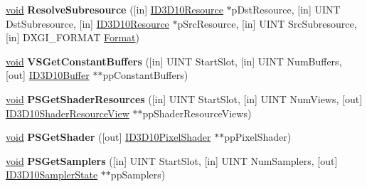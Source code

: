 \begin{DoxyCompactItemize}
\item 
\mbox{\label{interface_i_d3_d10_device_ae6de3bf40e277e9e668aef2fba4d8fac}} 
\hyperlink{interfacevoid}{void} {\bfseries Resolve\+Subresource} (\mbox{[}in\mbox{]} \hyperlink{interface_i_d3_d10_resource}{I\+D3\+D10\+Resource} $\ast$p\+Dst\+Resource, \mbox{[}in\mbox{]} U\+I\+NT Dst\+Subresource, \mbox{[}in\mbox{]} \hyperlink{interface_i_d3_d10_resource}{I\+D3\+D10\+Resource} $\ast$p\+Src\+Resource, \mbox{[}in\mbox{]} U\+I\+NT Src\+Subresource, \mbox{[}in\mbox{]} D\+X\+G\+I\+\_\+\+F\+O\+R\+M\+AT \hyperlink{struct_format}{Format})
\item 
\mbox{\label{interface_i_d3_d10_device_a93ee08cdda4d11807fce58d443b13fc6}} 
\hyperlink{interfacevoid}{void} {\bfseries V\+S\+Get\+Constant\+Buffers} (\mbox{[}in\mbox{]} U\+I\+NT Start\+Slot, \mbox{[}in\mbox{]} U\+I\+NT Num\+Buffers, \mbox{[}out\mbox{]} \hyperlink{interface_i_d3_d10_buffer}{I\+D3\+D10\+Buffer} $\ast$$\ast$pp\+Constant\+Buffers)
\item 
\mbox{\label{interface_i_d3_d10_device_a800e63ad580a2a79344c3f171583de3b}} 
\hyperlink{interfacevoid}{void} {\bfseries P\+S\+Get\+Shader\+Resources} (\mbox{[}in\mbox{]} U\+I\+NT Start\+Slot, \mbox{[}in\mbox{]} U\+I\+NT Num\+Views, \mbox{[}out\mbox{]} \hyperlink{interface_i_d3_d10_shader_resource_view}{I\+D3\+D10\+Shader\+Resource\+View} $\ast$$\ast$pp\+Shader\+Resource\+Views)
\item 
\mbox{\label{interface_i_d3_d10_device_ab8f48c5972099e7e4f235a51327627ec}} 
\hyperlink{interfacevoid}{void} {\bfseries P\+S\+Get\+Shader} (\mbox{[}out\mbox{]} \hyperlink{interface_i_d3_d10_pixel_shader}{I\+D3\+D10\+Pixel\+Shader} $\ast$$\ast$pp\+Pixel\+Shader)
\item 
\mbox{\label{interface_i_d3_d10_device_a2d06443bc1afdc924011950a881da37a}} 
\hyperlink{interfacevoid}{void} {\bfseries P\+S\+Get\+Samplers} (\mbox{[}in\mbox{]} U\+I\+NT Start\+Slot, \mbox{[}in\mbox{]} U\+I\+NT Num\+Samplers, \mbox{[}out\mbox{]} \hyperlink{interface_i_d3_d10_sampler_state}{I\+D3\+D10\+Sampler\+State} $\ast$$\ast$pp\+Samplers)
\item 
\mbox{\label{interface_i_d3_d10_device_a5cddcdb75bcabcfb0826b8d10482df41}} 

\end{DoxyCompactItemize}
